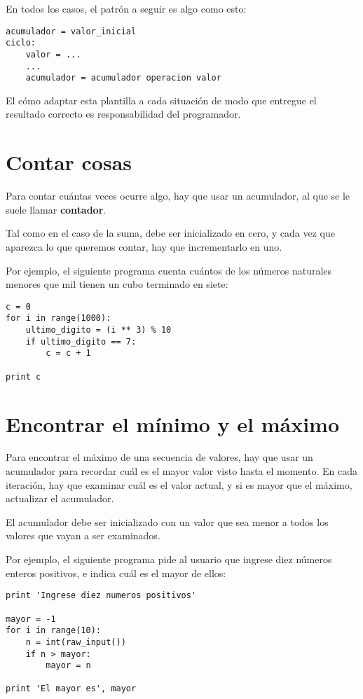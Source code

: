En todos los casos, el patrón a seguir es algo como esto:

\begin{lstlisting}
acumulador = valor_inicial
ciclo:
    valor = ...
    ...
    acumulador = acumulador operacion valor
\end{lstlisting}

El cómo adaptar esta plantilla a cada situación de modo que entregue el
resultado correcto es responsabilidad del programador.

\section{Contar cosas}

Para contar cuántas veces ocurre algo, hay que usar un acumulador, al
que se le suele llamar \textbf{contador}.

Tal como en el caso de la suma, debe ser inicializado en cero, y cada
vez que aparezca lo que queremos contar, hay que incrementarlo en uno.

Por ejemplo, el siguiente programa cuenta cuántos de los números
naturales menores que mil tienen un cubo terminado en siete:

\begin{lstlisting}
c = 0
for i in range(1000):
    ultimo_digito = (i ** 3) % 10
    if ultimo_digito == 7:
        c = c + 1

print c
\end{lstlisting}

\section{Encontrar el mínimo y el máximo}

Para encontrar el máximo de una secuencia de valores, hay que usar un
acumulador para recordar cuál es el mayor valor visto hasta el momento.
En cada iteración, hay que examinar cuál es el valor actual, y si es
mayor que el máximo, actualizar el acumulador.

El acumulador debe ser inicializado con un valor que sea menor a todos
los valores que vayan a ser examinados.

Por ejemplo, el siguiente programa pide al usuario que ingrese diez
números enteros positivos, e indica cuál es el mayor de ellos:

\begin{lstlisting}
print 'Ingrese diez numeros positivos'

mayor = -1
for i in range(10):
    n = int(raw_input())
    if n > mayor:
        mayor = n

print 'El mayor es', mayor
\end{lstlisting}

